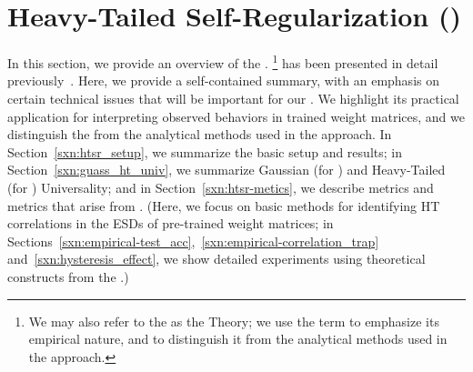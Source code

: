 \section{Heavy-Tailed Self-Regularization (\HTSR)}
\label{sxn:htsr}

In this section, we provide an overview of the \HTSR \Phenomenology.
\footnote{We may also refer to the \HTSR \Phenomenology as the \HTSR Theory; we use the term \Phenomenology to emphasize its empirical nature, and to distinguish it from the analytical methods used in the \SETOL approach.}
\HTSR has been presented in detail previously~\cite{MM19_HTSR_ICML,MM20_SDM,MM18_TR_JMLRversion}.%
Here, we provide a self-contained summary, with an emphasis on certain technical issues that will be important for our
\SETOL. We highlight its practical application for interpreting observed behaviors in trained weight matrices, and 
we distinguish the \HTSR \Phenomenology from the analytical methods used in the \SETOL approach.
In Section~\ref{sxn:htsr_setup}, we summarize the basic \HTSR setup and results;
in Section~\ref{sxn:guass_ht_univ}, we summarize Gaussian (for \RMT) and Heavy-Tailed (for \HTRMT) Universality; and
in Section~\ref{sxn:htsr-metics}, we describe \SHAPE metrics and \SCALE metrics that arise from \HTSR.
(Here, we focus on basic methods for identifying HT correlations in the ESDs of pre-trained weight matrices; 
in Sections~\ref{sxn:empirical-test_acc},~\ref{sxn:empirical-correlation_trap} and~\ref{sxn:hysteresis_effect}, we show detailed experiments using theoretical constructs from the \HTSR \Phenomenology.)





